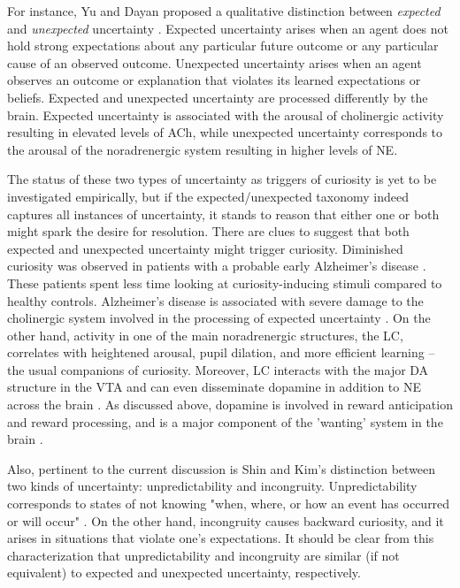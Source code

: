 For instance, Yu and Dayan proposed a qualitative distinction between \emph{expected} and \emph{unexpected} uncertainty \cite{yu_expected_2003,yu_uncertainty_2005}. Expected uncertainty arises when an agent does not hold strong expectations about any particular future outcome or any particular cause of an observed outcome. Unexpected uncertainty arises when an agent observes an outcome or explanation that violates its learned expectations or beliefs. Expected and unexpected uncertainty are processed differently by the brain. Expected uncertainty is associated with the arousal of cholinergic activity resulting in elevated levels of \ac{ACh}, while unexpected uncertainty corresponds to the arousal of the noradrenergic system resulting in higher levels of \ac{NE}.

The status of these two types of uncertainty as triggers of curiosity is yet to be investigated empirically, but if the expected/unexpected taxonomy indeed captures all instances of uncertainty, it stands to reason that either one or both might spark the desire for resolution. There are clues to suggest that both expected and unexpected uncertainty might trigger curiosity. Diminished curiosity was observed in patients with a probable early Alzheimer's disease \cite{daffner_diminished_1992}. These patients spent less time looking at curiosity-inducing stimuli compared to healthy controls. Alzheimer's disease is associated with severe damage to the cholinergic system \cite{ferreira-vieira_alzheimers_2016} involved in the processing of expected uncertainty \cite{yu_uncertainty_2005}. On the other hand, activity in one of the main noradrenergic structures, the \ac{LC}, correlates with heightened arousal, pupil dilation, and more efficient learning \cite{breton-provencher_locus_2021} -- the usual companions of curiosity. Moreover, \ac{LC} interacts with the major DA structure in the \ac{VTA} and can even disseminate dopamine in addition to \ac{NE} across the brain \cite{ranjbar-slamloo_dopamine_2020}. As discussed above, dopamine is involved in reward anticipation and reward processing, and is a major component of the 'wanting' system in the brain \cite{berridge_debate_2007}.

Also, pertinent to the current discussion is Shin and Kim's \cite{shin_homo_2019} distinction between two kinds of uncertainty: unpredictability and incongruity. Unpredictability corresponds to states of not knowing "when, where, or how an event has occurred or will occur" \cite[][p. 13]{shin_homo_2019}. On the other hand, incongruity causes backward curiosity, and it arises in situations that violate one's expectations. It should be clear from this characterization that unpredictability and incongruity are similar (if not equivalent) to expected and unexpected uncertainty, respectively.

